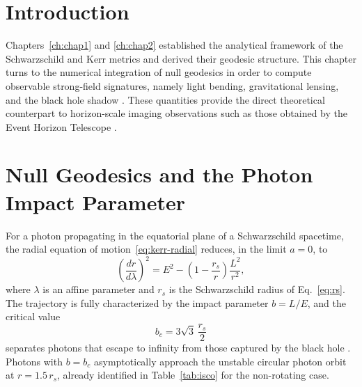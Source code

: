 \label{ch:chap3}

\section{Introduction}
Chapters~\ref{ch:chap1} and \ref{ch:chap2} established the analytical framework of the Schwarzschild and Kerr metrics and derived their geodesic structure. This chapter turns to the numerical integration of null geodesics in order to compute observable strong-field signatures, namely light bending, gravitational lensing, and the black hole shadow \cite{luminet1979}. These quantities provide the direct theoretical counterpart to horizon-scale imaging observations such as those obtained by the Event Horizon Telescope \cite{eht2019}.

\section{Null Geodesics and the Photon Impact Parameter}

For a photon propagating in the equatorial plane of a Schwarzschild spacetime, the radial equation of motion~\eqref{eq:kerr-radial} reduces, in the limit $a=0$, to
\begin{equation}
	\left(\frac{dr}{d\lambda}\right)^2 = E^2 - \left(1-\frac{r_s}{r}\right)\frac{L^2}{r^2},
	\label{eq:photon-radial}
\end{equation}
where $\lambda$ is an affine parameter and $r_s$ is the Schwarzschild radius of Eq.~\eqref{eq:rs}. The trajectory is fully characterized by the impact parameter $b=L/E$, and the critical value
\begin{equation}
	b_c = 3\sqrt{3}\,\frac{r_s}{2}
	\label{eq:critical-impact}
\end{equation}
separates photons that escape to infinity from those captured by the black hole \cite{chandrasekhar1983}. Photons with $b=b_c$ asymptotically approach the unstable circular photon orbit at $r=1.5\,r_s$, already identified in Table~\ref{tab:isco} for the non-rotating case.

